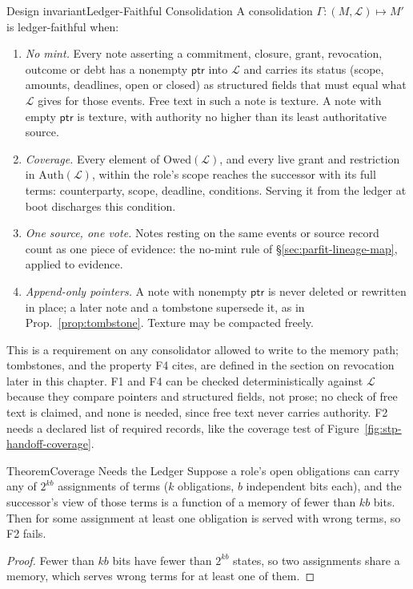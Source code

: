 \begin{pdclaim}{Design invariant}{Ledger-Faithful Consolidation}
\label{inv:stp-ledger-faithful}
\pdstatus{\Designed}{}
A consolidation $\Gamma:(M,\mathcal{L})\mapsto M'$ is ledger-faithful when:
\begin{enumerate}[label=F\arabic*,leftmargin=2.2em,itemsep=2pt]
\item \emph{No mint.} Every note asserting a commitment, closure, grant,
revocation, outcome or debt has a nonempty $\mathsf{ptr}$ into $\mathcal{L}$ and carries
its status (scope, amounts, deadlines, open or closed) as structured fields
that must equal what $\mathcal{L}$ gives for those events. Free text in such a note is
texture. A note with empty $\mathsf{ptr}$ is texture, with authority no higher
than its least authoritative source.
\item \emph{Coverage.} Every element of $\mathrm{Owed}(\mathcal{L})$, and every live grant
and restriction in $\mathrm{Auth}(\mathcal{L})$, within the role's scope reaches the
successor with its full terms: counterparty, scope, deadline, conditions.
Serving it from the ledger at boot discharges this condition.
\item \emph{One source, one vote.} Notes resting on the same events or source
record count as one piece of evidence: the no-mint rule of
\S\ref{sec:parfit-lineage-map}, applied to evidence.
\item \emph{Append-only pointers.} A note with nonempty $\mathsf{ptr}$ is never
deleted or rewritten in place; a later note and a tombstone supersede it, as in
Prop.~\ref{prop:tombstone}. Texture may be compacted freely.
\end{enumerate}
This is a requirement on any consolidator allowed to write to the memory path;
tombstones, and the property F4 cites, are defined in the section on revocation
later in this chapter.
F1 and F4 can be checked deterministically against
$\mathcal{L}$ because they compare pointers and structured fields, not prose; no check
of free text is claimed, and none is needed, since free text never carries
authority. F2 needs a declared list of required records, like the coverage test of
Figure~\ref{fig:stp-handoff-coverage}.
\end{pdclaim}

\begin{pdclaim}{Theorem}{Coverage Needs the Ledger}
\label{thm:stp-coverage-ledger}
Suppose a role's open obligations can carry any of $2^{kb}$ assignments of terms
($k$ obligations, $b$ independent bits each), and the successor's view of those
terms is a function of a memory of fewer than $kb$ bits. Then for some
assignment at least one obligation is served with wrong terms, so F2 fails.
\end{pdclaim}
\begin{proof}
Fewer than $kb$ bits have fewer than $2^{kb}$ states, so two assignments share a
memory, which serves wrong terms for at least one of them.
\end{proof}

